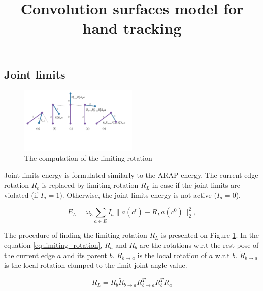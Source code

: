 \documentclass[tog]{acmsiggraph}
\title{Convolution surfaces model  for hand tracking}
\author{}
\begin{document}
\maketitle







\subsection{Joint limits}


\begin{figure}[h!] 
	\centering
	\hspace{0em}
	\includegraphics[trim = 0mm 70mm 0mm 0mm, width=0.5\textwidth]{fig/joint_limits}
	\caption{The computation of the limiting rotation}
	\label{fig:limiting_rotation}
\end{figure}

Joint limits energy is formulated similarly to the ARAP energy. The current edge rotation $R_e$ is replaced by limiting rotation $R_L$ in case if the joint limits are violated (if $I_a = 1$). Otherwise, the joint limits energy is not active ($I_a = 0$).

\begin{equation}
	E_{L} = \omega_3 \sum_{a \in E} I_a \| a(c^t) - R_L a(c^0)\|_2^2,
	\label{eq:joint_limits_energy}
\end{equation}

The procedure of finding the limiting rotation $R_L$ is presented on Figure \ref{fig:limiting_rotation}. In the equation \ref{eq:limiting_rotation}, $R_a$ and $R_b$ are the rotations w.r.t the rest pose of the current edge $a$ and its parent $b$. $R_{b\rightarrow a}$ is the local rotation of $a$ w.r.t $b$. $\tilde{R}_{b\rightarrow a} $ is the local rotation clumped to the limit joint angle value.
 
\begin{equation}
	R_L = R_b \tilde{R}_{b\rightarrow a} R^T_{b\rightarrow a} R^T_b R_a \label{eq:limiting_rotation}
\end{equation}
\end{document}
